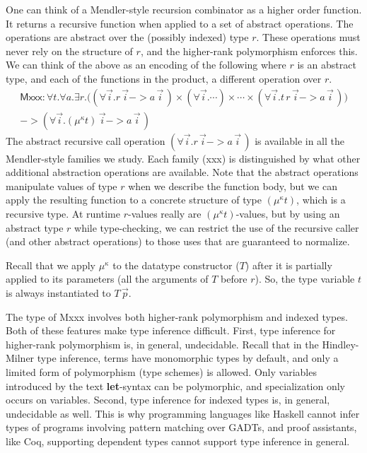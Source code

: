 One can think of a Mendler-style recursion combinator as a higher order
function. It returns a recursive function when applied
to a set of abstract operations. The operations are abstract over the 
(possibly indexed) type $r$. These operations must never rely on the structure
of $r$, and the higher-rank polymorphism enforces this.
We can think of the above as an encoding of the following
where $r$ is an abstract type, and each of the functions in the product, a different operation over $r$.
\begin{multline*}
 \textsf{Mxxx} : \forall t . \forall a .
 \exists r.
  \big(  (\forall\vec{i} . r\,\vec{i} -> a\,\vec{i}\,)
   \times (\forall\vec{i} . \cdots) \times \cdots
   \times (\forall\vec{i} . t\, r\,\vec{i} -> a\,\vec{i}\,)
   \big) \\
 -> (\forall\vec{i} . (\mu^\kappa t)\,\vec{i} -> a\,\vec{i}\,)
\end{multline*}
The abstract recursive call operation $(\forall\vec{i} . r\,\vec{i} -> a\,\vec{i}\,)$ is available in
all the Mendler-style families we study. Each family (\textsf{xxx})
is distinguished by what other additional abstraction operations are available.
Note that the abstract operations manipulate values of type $r$ when we describe
the function body, but we can apply the resulting function
to a concrete structure of type $(\mu^\kappa t)$, which is a recursive type.
At runtime $r$-values really are $(\mu^\kappa t)$-values, but
by using an abstract type $r$ while type-checking, we
can restrict the use of the recursive caller (and other abstract operations) to those uses that are guaranteed to normalize. 

Recall that we apply
$\mu^\kappa$ to the datatype constructor ($T$) after it is partially applied to its parameters 
(all the arguments of $T$ before $r$). So, the type variable $t$ is always
instantiated to $T\,\vec{p}$.

The type of \textsf{Mxxx} involves both higher-rank polymorphism and
indexed types. Both of these features make type inference difficult.
First, type inference for higher-rank polymorphism is, in general, undecidable.
Recall that in the Hindley-Milner type inference, terms have monomorphic types
by default, and only a limited form of polymorphism (type schemes) is allowed.
Only variables introduced by the text {\bf let}-syntax can be
polymorphic, and specialization only occurs on variables. 
Second, type inference for indexed types is, in general, undecidable as well.
This is why programming languages like Haskell cannot infer types of programs
involving pattern matching over GADTs, and proof assistants, like Coq, supporting
dependent types cannot support type inference in general. 

